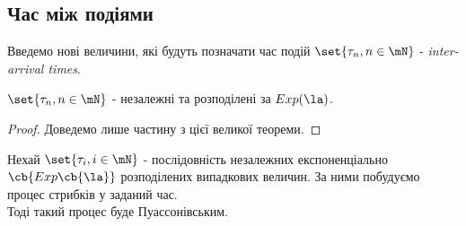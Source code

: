 \subsection{Час між подіями}
Введемо нові величини, які будуть позначати час подій $\set{\tau_n,n\in\mN}$ - \textit{inter-arrival times}.
\begin{teor}
	$\set{\tau_n,n\in\mN}$ - незалежні та розподілені за $Exp(\la)$.
\end{teor}
\begin{proof}
	Доведемо лише частину з цієї великої теореми.
\end{proof}
\begin{teor}
	Нехай $\set{\tau_i,i\in\mN}$ - послідовність незалежних експоненціально $\cb{Exp\cb{\la}}$ розподілених випадкових величин. 	За ними побудуємо процес стрибків у заданий час.\\
	Тоді такий процес буде Пуассонівським.
\end{teor}
